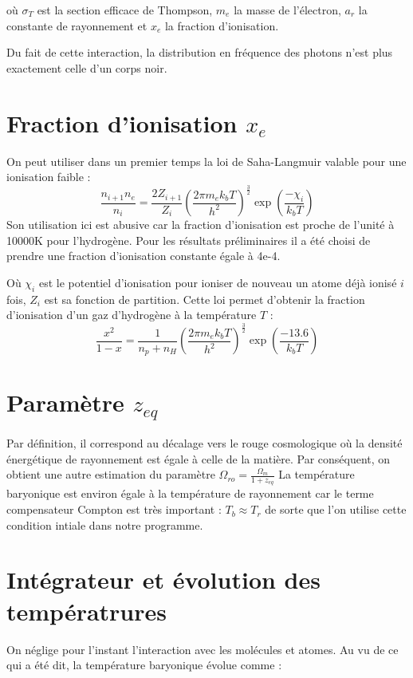 \documentclass[10pt, a4paper]{report}
\numberwithin{equation}{subsection}
\begin{document}
 où $\sigma_T$ est la section efficace de Thompson, $m_e$ la masse de l'électron, $a_r$ la constante de rayonnement et $x_e$ la fraction d'ionisation.

Du fait de cette interaction, la distribution en fréquence des photons n'est plus exactement celle d'un corps noir.   
 
\section{Fraction d'ionisation $x_e$}
On peut utiliser dans un premier temps la loi de Saha-Langmuir valable pour une ionisation faible :
\begin{equation} \label{eq:XE}
\boxed{\frac{n_{i+1} n_e }{n_i} = \frac{2 Z_{i+1}}{Z_i} \left( \frac{2\pi m_ek_bT}{h^2}\right)^{\frac{3}{2}} \exp(\frac{-\chi_i}{k_bT})}
\end{equation}
Son utilisation ici est abusive car la fraction d'ionisation est proche de l'unité à 10000K pour l'hydrogène. Pour les résultats préliminaires il a été choisi de prendre une fraction d'ionisation constante égale à 4e-4.

Où $\chi_i$ est le potentiel d'ionisation pour ioniser de nouveau un atome déjà ionisé $i$ fois, $Z_i$ est sa fonction de partition. Cette loi permet d'obtenir la fraction d'ionisation d'un gaz d'hydrogène à la température $T$ :
\begin{equation} \label{eq:XE}
\boxed{\frac{x^2}{1-x} = \frac{1}{n_p+n_H} \left( \frac{2\pi m_ek_bT}{h^2}\right)^{\frac{3}{2}} \exp(\frac{-13.6}{k_bT})}
\end{equation}

\section{Paramètre $z_{eq}$}
Par définition, il correspond au décalage vers le rouge cosmologique où la densité énergétique de rayonnement est égale à celle de la matière. Par conséquent, on obtient une autre estimation du paramètre $\Omega_{ro} = \frac{\Omega_{m}}{1+z_{eq}}$  La température baryonique est environ égale à la température de rayonnement car le terme compensateur Compton est très important : $T_b \approx T_r$ de sorte que l'on utilise cette condition intiale dans notre programme.

\section{Intégrateur et évolution des températrures}
On néglige pour l'instant l'interaction avec les molécules et atomes. Au vu de ce qui a été dit, la température baryonique évolue comme :
\end{document}
